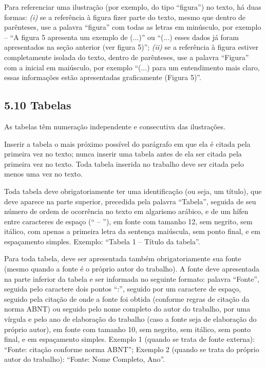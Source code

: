 \documentclass[
	12pt,				%
	oneside,			%
	a4paper,			%
	english,			%
	brazil				%
	]{abntex2ppgsi}
\begin{document}
\begin{anexosenv}
Para referenciar uma ilustração (por exemplo, do tipo ``figura'') no texto, há duas formas: \textit{(i)} se a referência à figura fizer parte do texto, mesmo que dentro de parênteses, use a palavra ``figura'' com todas as letras em minúsculo, por exemplo – ``A figura 5 apresenta um exemplo de (...)'' ou ``(...) esses dados já foram apresentados na seção anterior (ver figura 5)''; \textit{(ii)} se a referência à figura estiver completamente isolada do texto, dentro de parênteses, use a palavra ``Figura'' com a inicial em maiúsculo, por exemplo ``(...) para um entendimento mais claro, essas informações estão apresentadas graficamente (Figura 5)''.

\subsection*{5.10 Tabelas}

As tabelas têm numeração independente e consecutiva das ilustrações.

Inserir a tabela o mais próximo possível do parágrafo em que ela é citada pela primeira vez no texto; nunca inserir uma tabela antes de ela ser citada pela primeira vez no texto. Toda tabela inserida no trabalho deve ser citada pelo menos uma vez no texto.

Toda tabela deve obrigatoriamente ter uma identificação (ou seja, um título), que deve aparece na parte superior, precedida pela palavra ``Tabela'', seguida de seu número de ordem de ocorrência no texto em algarismo arábico, e de um hífen entre caracteres de espaço (`` – ''), em fonte com tamanho 12, sem negrito, sem itálico, com apenas a primeira letra da sentença maiúscula, sem ponto final, e em espaçamento simples. Exemplo: ``Tabela 1 – Título da tabela''.

Para toda tabela, deve ser apresentada também obrigatoriamente sua fonte (mesmo quando a fonte é o próprio autor do trabalho). A fonte deve apresentada na parte inferior da tabela e ser informada no seguinte formato: palavra ``Fonte'', seguida pelo caractere dois pontos ``:'', seguido por um caractere de espaço, seguido pela citação de onde a fonte foi obtida (conforme regras de citação da norma ABNT) ou seguido pelo nome completo do autor do trabalho, por uma vírgula e pelo ano de elaboração do trabalho (caso a fonte seja de elaboração do próprio autor), em fonte com tamanho 10, sem negrito, sem itálico, sem ponto final, e em espaçamento simples. Exemplo 1 (quando se trata de fonte externa): ``Fonte: citação conforme norma ABNT''; Exemplo 2 (quando se trata do próprio autor do trabalho): ``Fonte: Nome Completo, Ano''.


\end{anexosenv}
\end{document}

